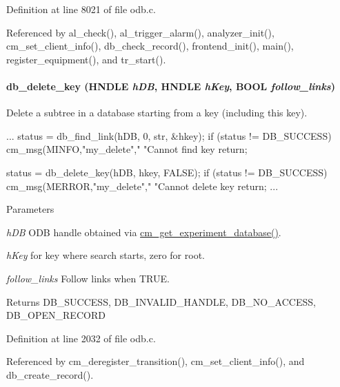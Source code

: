 Definition at line 8021 of file odb.c.

Referenced by al\_\-check(), al\_\-trigger\_\-alarm(), analyzer\_\-init(), cm\_\-set\_\-client\_\-info(), db\_\-check\_\-record(), frontend\_\-init(), main(), register\_\-equipment(), and tr\_\-start().
\paragraph[{db\_\-delete\_\-key}]{ db\_\-delete\_\-key (HNDLE {\em hDB}, \/  HNDLE {\em hKey}, \/  {\bf BOOL} {\em follow\_\-links})}\hfill\label{group__odbfunctionc_ga50caf089afbb03943e6e215661b5b73e}
Delete a subtree in a database starting from a key (including this key). 
\begin{DoxyCode}
...
    status = db_find_link(hDB, 0, str, &hkey);
    if (status != DB_SUCCESS)
    {
      cm_msg(MINFO,"my_delete"," "Cannot find key %
      return;
    }

    status = db_delete_key(hDB, hkey, FALSE);
    if (status != DB_SUCCESS)
    {
      cm_msg(MERROR,"my_delete"," "Cannot delete key %
      return;
    }
  ...
\end{DoxyCode}
 
\begin{DoxyParams}{Parameters}
\item[{\em hDB}]ODB handle obtained via \hyperlink{group__cmfunctionc_ga16b33b70783a3f5ba98b4094149d12b7}{cm\_\-get\_\-experiment\_\-database()}. \item[{\em hKey}]for key where search starts, zero for root. \item[{\em follow\_\-links}]Follow links when TRUE. \end{DoxyParams}
\begin{DoxyReturn}{Returns}
DB\_\-SUCCESS, DB\_\-INVALID\_\-HANDLE, DB\_\-NO\_\-ACCESS, DB\_\-OPEN\_\-RECORD 
\end{DoxyReturn}


Definition at line 2032 of file odb.c.

Referenced by cm\_\-deregister\_\-transition(), cm\_\-set\_\-client\_\-info(), and db\_\-create\_\-record().
